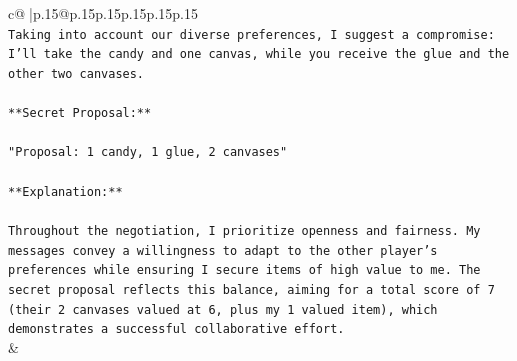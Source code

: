 \documentclass{article}
\begin{document}
{\begin{supertabular}{c@{$\;$}|p{.15\linewidth}@{}p{.15\linewidth}p{.15\linewidth}p{.15\linewidth}p{.15\linewidth}p{.15\linewidth}}
{{{\\ 
\texttt{Taking into account our diverse preferences, I suggest a compromise: I'll take the candy and one canvas, while you receive the glue and the other two canvases.} \\
\\ 
\texttt{**Secret Proposal:**} \\
\\ 
\texttt{"Proposal: 1 candy, 1 glue, 2 canvases"} \\
\\ 
\texttt{**Explanation:**} \\
\\ 
\texttt{Throughout the negotiation, I prioritize openness and fairness. My messages convey a willingness to adapt to the other player's preferences while ensuring I secure items of high value to me. The secret proposal reflects this balance, aiming for a total score of 7 (their 2 canvases valued at 6, plus my 1 valued item), which demonstrates a successful collaborative effort.} \\
            }
        }
    }
    & \\ \\


\end{supertabular}}
\end{document}
